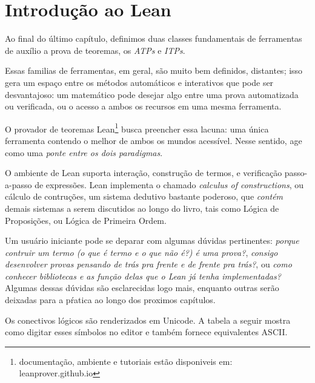 \chapter{Introdução ao Lean }

Ao final do último capítulo, definimos duas classes fundamentais de ferramentas de auxílio a prova de teoremas, os \textit{ATPs} e \textit{ITPs}.

Essas familias de ferramentas, em geral, são muito bem definidos, distantes; isso gera um espaço entre os métodos automáticos e interativos que pode ser desvantajoso: um  matemático pode desejar algo entre uma prova automatizada ou verificada, ou o acesso a ambos os recursos em uma mesma ferramenta.

O provador de teoremas Lean\footnote{documentação, ambiente e tutoriais estão disponiveis em: leanprover.github.io} busca preencher essa lacuna: uma única ferramenta contendo o melhor de ambos os mundos acessível.
Nesse sentido, age como uma \textit{ponte entre os dois paradigmas}.


O ambiente de Lean suporta interação, construção de termos, e verificação passo-a-passo de expressões.
Lean implementa o chamado \textit{calculus of constructions}, ou cálculo de contruções, um sistema dedutivo bastante poderoso, que \textit{contém} demais sistemas a serem discutidos ao longo do livro, tais como Lógica de Proposições, ou Lógica de Primeira Ordem.

Um usuário iniciante pode se deparar com algumas dúvidas pertinentes: \textit{porque contruir um termo (o que é termo e o que não é?) é uma prova?}, \textit{consigo desenvolver provas pensando de trás pra frente e de frente pra trás?}, ou \textit{como conhecer bibliotecas e as função delas que o Lean já tenha implementadas?} Algumas dessas dúvidas são esclarecidas logo mais, enquanto outras serão deixadas para a pŕatica ao longo dos proximos capítulos.

Os conectivos lógicos são renderizados em Unicode. 
A tabela a seguir mostra como digitar esses símbolos no editor e também fornece equivalentes ASCII.


